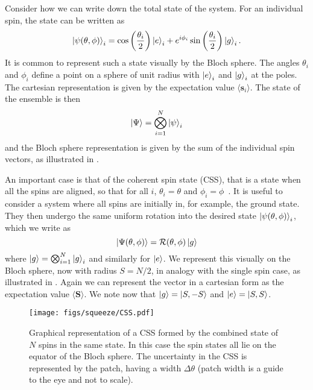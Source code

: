 Consider how we can write down the total state of the system. For an individual
spin, the state can be written as
%
\begin{equation}
  \ket{\psi(\theta, \phi)}_i = \cos\left(\frac{\theta_i}{2}\right)\ket{e}_i +
  e^{i\phi_i}\sin\left(\frac{\theta_i}{2}\right)\ket{g}_i.
  \label{eqn:blochspin}
\end{equation}
%
It is common to represent such a state visually by the Bloch sphere.
The angles $\theta_i$ and $\phi_i$ define a point on a sphere of unit
radius with $\ket{e}_i$ and $\ket{g}_i$ at the poles. The cartesian
representation is given by the expectation value $\langle \mathbf{s}_i
\rangle$.
%
The state of the ensemble is then
%
\begin{equation}
  \ket{\Psi} = \bigotimes_{i=1}^N \ket{\psi}_i
\end{equation}
%
and the Bloch sphere representation is given by the sum of the individual spin
vectors, as illustrated in .

An important case is that of the coherent spin state (CSS), that is a
state when all the spins are aligned, so that for all $i$, $\theta_i = \theta$
and $\phi_i = \phi$~\cite{MA201189, Gazeau2009}.
It is useful to consider a system where all spins are initially
in, for example, the ground state. They then undergo the same uniform rotation
into the desired state $\ket{\psi(\theta, \phi)}_i$, which we write as
%
\begin{equation}
  \ket{\Psi(\theta,\phi)} = \mathcal{R}(\theta, \phi)\ket{g}
\end{equation}
%
where $\ket{g} = \bigotimes_{i=1}^N\ket{g}_i$ and similarly for $\ket{e}$. We
represent this visually on the Bloch sphere, now with radius $S=N/2$, in
analogy with the single spin case, as illustrated in . Again
we can represent the vector in a cartesian form as the expectation value
$\langle \mathbf{S} \rangle$. 
%
We note now that $\ket{g} = \ket{S,-S}$ and $\ket{e}=\ket{S,S}$.


\begin{figure}[ht]
  \centering
    \texttt{[image: figs/squeeze/CSS.pdf]}
    \label{squeeze:fig:CSS}
    \caption{
      Graphical representation of a CSS formed by the combined state of $N$
      spins in the same state. In this case the spin states all lie on the
      equator of the Bloch sphere. The uncertainty in the CSS is represented by
      the patch, having a width $\Delta\theta$ (patch width is a guide to the
      eye and not to scale).
  }
\end{figure}

